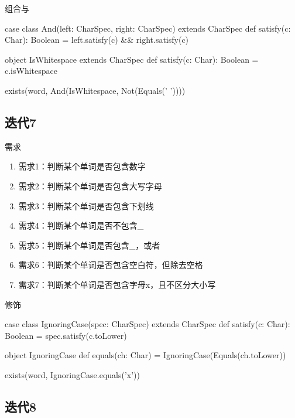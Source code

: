 \begin{frame}[fragile]{组合与}
  \begin{scala}
case class And(left: CharSpec, right: CharSpec) extends CharSpec {
  def satisfy(c: Char): Boolean = 
    left.satisfy(c) && right.satisfy(c)
}

object IsWhitespace extends CharSpec {
  def satisfy(c: Char): Boolean = c.isWhitespace
}

exists(word, And(IsWhitespace, Not(Equals(' '))))
  \end{scala}
\end{frame}

\subsection{迭代7}

\begin{frame}{需求}
  \begin{block}{}
    \begin{enumerate}
    \item \alert{需求1}：判断某个单词是否包含数字
    \item \alert{需求2}：判断某个单词是否包含大写字母
    \item \alert{需求3}：判断某个单词是否包含下划线 
    \item \alert{需求4}：判断某个单词是否不包含\_
    \item \alert{需求5}：判断某个单词是否包含\_，或者\*     
    \item \alert{需求6}：判断某个单词是否包含空白符，但除去空格
    \item \alert{需求7}：判断某个单词是否包含字母x，且不区分大小写
    \end{enumerate}
  \end{block}
\end{frame}

\begin{frame}[fragile]{修饰}
  \begin{scala}
case class IgnoringCase(spec: CharSpec) extends CharSpec {
  def satisfy(c: Char): Boolean = spec.satisfy(c.toLower)
}

object IgnoringCase {
  def equals(ch: Char) = IgnoringCase(Equals(ch.toLower))
}

exists(word, IgnoringCase.equals('x'))
  \end{scala}
\end{frame}

\subsection{迭代8}

